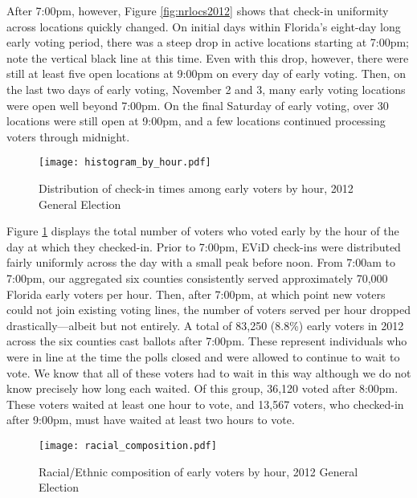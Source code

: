 \documentclass[12pt,titlepage]{article}
\begin{document}
After 7:00pm, however, Figure \ref{fig:nrlocs2012} shows that check-in
uniformity across locations quickly changed.  On initial days within
Florida's eight-day long early voting period, there was a steep drop
in active locations starting at 7:00pm; note the vertical black line
at this time.  Even with this drop, however, there were still at least
five open locations at 9:00pm on every day of early voting.  Then, on
the last two days of early voting, November 2 and 3, many early voting
locations were open well beyond 7:00pm.  On the final Saturday of
early voting, over 30 locations were still open at 9:00pm, and a few
locations continued processing voters through midnight.

\begin{figure}[!ht]
\caption{Distribution of check-in times among early voters by hour, 2012
  General Election}
  \label{fig:hist2012}
  \centering
    \centering\texttt{[image: histogram\_by\_hour.pdf]}
\end{figure}

Figure \ref{fig:hist2012} displays the total number of voters who
voted early by the hour of the day at which they checked-in. Prior to
7:00pm, EViD check-ins were distributed fairly uniformly across the
day with a small peak before noon.  From 7:00am to 7:00pm, our
aggregated six counties consistently served approximately 70,000
Florida early voters per hour. Then, after 7:00pm, at which point new
voters could not join existing voting lines, the number of voters
served per hour dropped drastically---albeit but not entirely.  A
total of 83,250 (8.8\%) early voters in 2012 across the six counties
cast ballots after 7:00pm. These represent individuals who were in
line at the time the polls closed and were allowed to continue to wait
to vote.  We know that all of these voters had to wait in this way
although we do not know precisely how long each waited.  Of this
group, 36,120 voted after 8:00pm.  These voters waited at least one
hour to vote, and 13,567 voters, who checked-in after 9:00pm, must
have waited at least two hours to vote.




\begin{figure}[!ht]
\caption{Racial/Ethnic composition of early voters by hour, 2012 General Election}
  \label{fig:race2012}
  \centering
    \centering\texttt{[image: racial\_composition.pdf]}
\end{figure}
\end{document}
